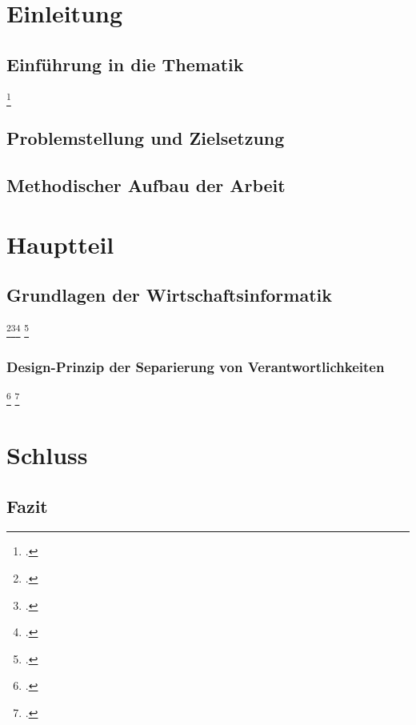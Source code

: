 \section{Einleitung}
\subsection{Einführung in die Thematik}
\blindtext{}
\blindtext\footcite[Vgl. ][]{mswpf}

\subsection{Problemstellung und Zielsetzung}
\blindtext

\subsection{Methodischer Aufbau der Arbeit}
\blindtext

\section{Hauptteil}
\subsection{Grundlagen der Wirtschaftsinformatik}
\blindtext\footcite[Vgl. ][]{msdatabind}\footcite[Vgl. ][]{Atypisch}\footcite[Vgl. ][34]{Digitalökonomie}
\blindenumerate
\Blindtext
\blindtext\footcite[Vgl. ][415-426]{Tanenbaum2016}

\subsubsection{Design-Prinzip der Separierung von Verantwortlichkeiten}
\blindtext\footcite[Vgl. ][79]{Schelinski2019}
\blinditemize
\Blindtext\footcite[Vgl. ][34]{Digitalökonomie}

\section{Schluss}
\subsection{Fazit}
\Blindtext
